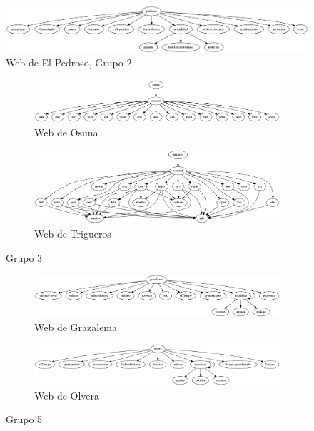 \begin{figure}
\hspace*{-1cm}\includegraphics[scale=0.4]{trabajo_previo/El_pedroso.png}
\caption{Web de El Pedroso, Grupo 2}
\label{fig:grupo2}
\end{figure}
\begin{figure}


\begin{subfigure}[b]{0.5\textwidth}
\includegraphics[scale=0.45]{trabajo_previo/Osuna.png}
\caption{Web de Osuna}
\end{subfigure}

\begin{subfigure}[b]{0.5\textwidth}
\includegraphics[scale=0.45]{trabajo_previo/Trigueros.png}
\caption{Web de Trigueros}
\end{subfigure}
\caption{Grupo 3}
\label{fig:grupo3}
\end{figure}
\begin{figure}

\begin{subfigure}[b]{0.5\textwidth}
\hspace*{-2cm}\includegraphics[scale=0.45]{trabajo_previo/Grazalema.png}
\caption{Web de Grazalema}
\end{subfigure}

\begin{subfigure}[b]{0.5\textwidth}
\hspace*{-1.6cm}\includegraphics[scale=0.45]{trabajo_previo/Olvera.png}
\caption{Web de Olvera}
\end{subfigure}
\caption{Grupo 5}
\label{fig:grupo5}
\end{figure}

